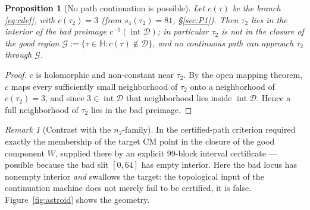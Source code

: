 \documentclass[11pt]{article}
\newtheorem{proposition}[theorem]{Proposition}
\theoremstyle{definition}
\theoremstyle{remark}
\newtheorem{remark}[theorem]{Remark}
\newcommand{\Hh}{\mathbb{H}}
\begin{document}
\begin{proposition}[No path continuation is possible]\label{prop:nopath}
Let $c(\tau)$ be the branch \eqref{eq:cdef}, with $c(\tau_2)=3$
\textup{(}from $s_4(\tau_2)=81$, \S\ref{sec:P1}\textup{)}. Then $\tau_2$
lies in the \emph{interior} of the bad preimage
$c^{-1}(\operatorname{int}\mathcal D)$; in particular $\tau_2$ is not in
the closure of the good region
$\mathcal G:=\{\tau\in\Hh:c(\tau)\notin\mathcal D\}$, and no continuous
path can approach $\tau_2$ through $\mathcal G$.
\end{proposition}
\begin{proof}
$c$ is holomorphic and non-constant near $\tau_2$. By the open mapping
theorem, $c$ maps every sufficiently small neighborhood of $\tau_2$
onto a neighborhood of $c(\tau_2)=3$, and since
$3\in\operatorname{int}\mathcal D$ that neighborhood lies inside
$\operatorname{int}\mathcal D$. Hence a full neighborhood of $\tau_2$
lies in the bad preimage.
\end{proof}

\begin{remark}[Contrast with the $n_2$-family]
In \cite{Zf} the certified-path criterion required exactly the
membership of the target CM point in the closure of the good component
$W$, supplied there by an explicit $99$-block interval certificate ---
possible because the bad slit $[0,64]$ has empty interior. Here the bad
locus has nonempty interior \emph{and} swallows the target: the
topological input of the continuation machine does not merely fail to be
certified, it is false. Figure~\ref{fig:astroid} shows the geometry.
\end{remark}
\end{document}
